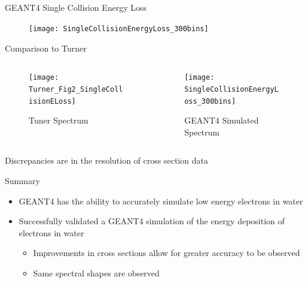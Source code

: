 \documentclass[compress]{beamer}
\begin{document}
\subsection*{}
\begin{frame}{GEANT4 Single Collision Energy Loss}
  \begin{figure}
    \texttt{[image: SingleCollisionEnergyLoss\_300bins]}
  \end{figure}
\end{frame}
\begin{frame}{Comparison to Turner}
  \begin{columns}[onlytextwidth]
    \begin{column}{0.45\textwidth}
      \begin{figure}
        \texttt{[image: Turner\_Fig2\_SingleCollisionELoss]}
        \caption{Tuner Spectrum}
      \end{figure}
    \end{column}
    \begin{column}{0.45\textwidth}
      \begin{figure}
        \texttt{[image: SingleCollisionEnergyLoss\_300bins]}
        \caption{GEANT4 Simulated Spectrum}
    \end{figure}
    \end{column}
  \end{columns}
\vspace{2mm}
Discrepancies are in the resolution of cross section data
\end{frame}
\begin{frame}{Summary}
  \begin{itemize}
    \item GEANT4 has the ability to accurately simulate low energy electrons in water
    \item Successfully validated a GEANT4 simulation of the energy deposition of electrons in water
    \begin{itemize}
      \item Improvements in cross sections allow for greater accuracy to be observed
      \item Same spectral shapes are observed
    \end{itemize}
  \end{itemize}
\end{frame}
\end{document}
